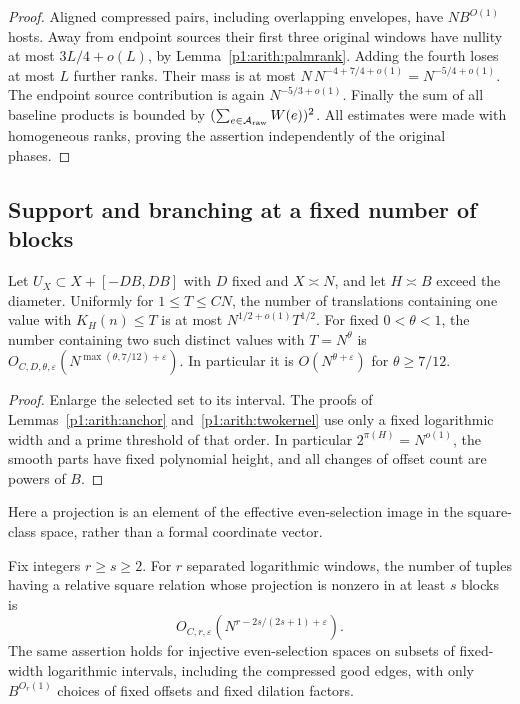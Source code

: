 \begin{proof}
Aligned compressed pairs, including overlapping envelopes, have
$NB^{O(1)}$ hosts.  Away from endpoint sources their first three original
windows have nullity at most $3L/4+o(L)$, by
Lemma~\ref{p1:arith:palmrank}.  Adding the fourth loses at most $L$
further ranks.  Their mass is at most
$N\,N^{-4+7/4+o(1)}=N^{-5/4+o(1)}$.
The endpoint source contribution is again $N^{-5/3+o(1)}$.
Finally the sum of all baseline products is bounded by
$(\sum_{e\in\mathcal A_{\rm raw}}W(e))^2$.
All estimates were made with homogeneous ranks, proving the assertion
independently of the original phases.
\end{proof}

\subsection{Support and branching at a fixed number of blocks}

\begin{lemma}
\label{p1:arith:small-kernels}
Let $U_X\subset X+[-DB,DB]$ with $D$ fixed and $X\asymp N$, and let
$H\asymp B$ exceed the diameter.  Uniformly for $1\leq T\leq CN$,
the number of translations containing one value with $K_H(n)\leq T$
is at most $N^{1/2+o(1)}T^{1/2}$.  For fixed $0<\theta<1$, the number
containing two such distinct values with $T=N^\theta$ is
$O_{C,D,\theta,\varepsilon}(N^{\max(\theta,7/12)+\varepsilon})$.
In particular it is $O(N^{\theta+\varepsilon})$ for $\theta\geq7/12$.
\end{lemma}

\begin{proof}
Enlarge the selected set to its interval.  The proofs of
Lemmas~\ref{p1:arith:anchor} and~\ref{p1:arith:twokernel} use only a
fixed logarithmic width and a prime threshold of that order.  In particular
$2^{\pi(H)}=N^{o(1)}$, the smooth parts have fixed polynomial height,
and all changes of offset count are powers of $B$.
\end{proof}

Here a projection is an element of the effective even-selection image
in the square-class space, rather than a formal coordinate vector.

\begin{proposition}
\label{p1:arith:fixed-support}
Fix integers $r\geq s\geq2$.  For $r$ separated logarithmic windows,
the number of tuples having a relative square relation whose projection
is nonzero in at least $s$ blocks is
\[
 O_{C,r,\varepsilon}\left(N^{r-2s/(2s+1)+\varepsilon}\right).
\]
The same assertion holds for injective even-selection spaces on subsets
of fixed-width logarithmic intervals, including the compressed good edges,
with only $B^{O_r(1)}$ choices of fixed offsets and fixed dilation factors.
\end{proposition}

